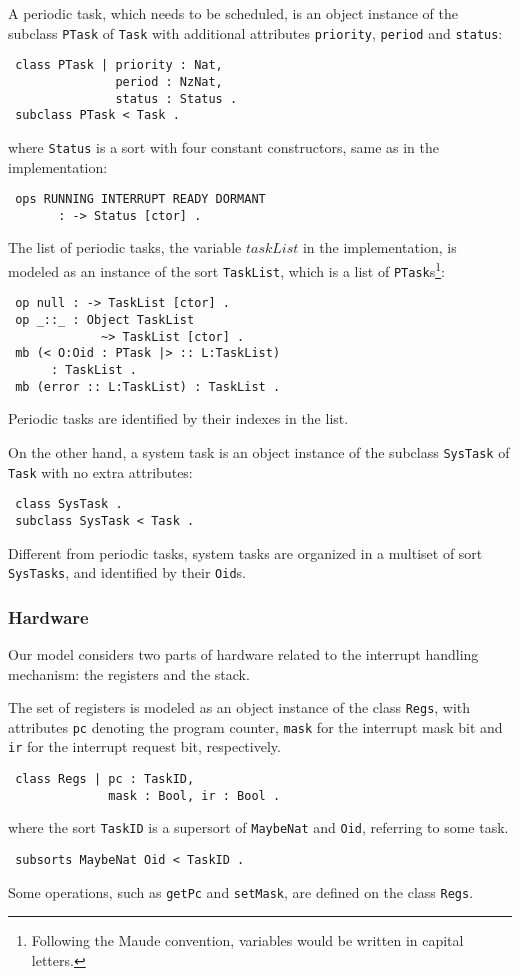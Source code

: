 \documentclass[10pt,journal]{IEEEtran}
\begin{document}
A periodic task, which needs to be scheduled, is an object instance of
the subclass \verb|PTask| of \verb|Task| with additional attributes
\verb|priority|, \verb|period| and \verb|status|:
\begin{verbatim}
 class PTask | priority : Nat, 
               period : NzNat, 
               status : Status .
 subclass PTask < Task .
\end{verbatim}
where \verb|Status| is a sort with four constant constructors, same as
in the implementation:
\begin{verbatim}
 ops RUNNING INTERRUPT READY DORMANT 
       : -> Status [ctor] .
\end{verbatim}
The list of periodic tasks, the variable $taskList$ in the
implementation, is modeled as an instance of the sort \verb|TaskList|,
which is a list of \verb|PTask|s\footnote{Following the Maude
  convention, variables would be written in capital letters.}:
\begin{verbatim}
 op null : -> TaskList [ctor] .
 op _::_ : Object TaskList 
             ~> TaskList [ctor] .
 mb (< O:Oid : PTask |> :: L:TaskList) 
      : TaskList .
 mb (error :: L:TaskList) : TaskList .
\end{verbatim}
Periodic tasks are identified by their indexes in the list.

On the other hand, a system task is an object instance of the subclass
\verb|SysTask| of \verb|Task| with no extra attributes:
\begin{verbatim}
 class SysTask .            
 subclass SysTask < Task .
\end{verbatim}
Different from periodic tasks, system tasks are organized in a
multiset of sort \verb|SysTasks|, and identified by their \verb|Oid|s.

\subsubsection{Hardware}
Our model considers two parts of hardware related to the interrupt
handling mechanism: the registers and the stack.

The set of registers is modeled as an object instance of the class
\verb|Regs|, with attributes \verb|pc| denoting the program counter,
\verb|mask| for the interrupt mask bit and \verb|ir| for the interrupt
request bit, respectively.
\begin{verbatim}
 class Regs | pc : TaskID, 
              mask : Bool, ir : Bool .
\end{verbatim}
where the sort \verb|TaskID| is a supersort of \verb|MaybeNat| and
\verb|Oid|, referring to some task.
\begin{verbatim}
 subsorts MaybeNat Oid < TaskID .
\end{verbatim}
Some operations, such as \verb|getPc| and \verb|setMask|, are defined
on the class \verb|Regs|.
\end{document}
